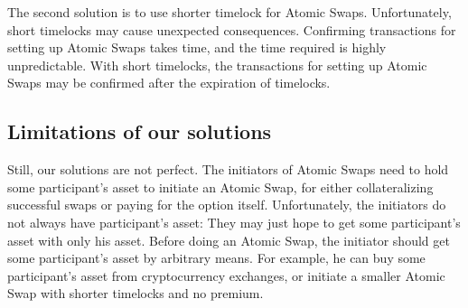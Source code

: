 The second solution is to use shorter timelock for Atomic Swaps.
Unfortunately, short timelocks may cause unexpected consequences.
Confirming transactions for setting up Atomic Swaps takes time, and the time required is highly unpredictable.
With short timelocks, the transactions for setting up Atomic Swaps may be confirmed after the expiration of timelocks.


\subsection{Limitations of our solutions}

Still, our solutions are not perfect.
The initiators of Atomic Swaps need to hold some participant's asset to initiate an Atomic Swap,
for either collateralizing successful swaps or paying for the option itself.
Unfortunately, the initiators do not always have participant's asset: They may just hope to get some participant's asset with only his asset.
Before doing an Atomic Swap, the initiator should get some participant's asset by arbitrary means.
For example, he can buy some participant's asset from cryptocurrency exchanges, or initiate a smaller Atomic Swap with shorter timelocks and no premium.